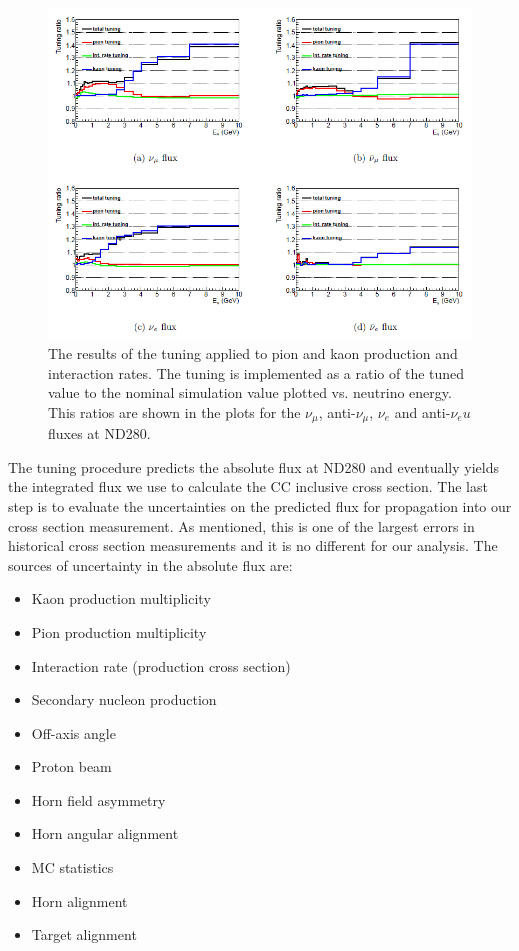 \begin{figure}
\centering
\includegraphics[width=6.5in]{Figures/flux/tuningresult.PNG}
\caption{The results of the tuning applied to pion and kaon production and interaction rates. The tuning is implemented as a ratio of the tuned value to the nominal simulation value plotted vs. neutrino energy. This ratios are shown in the plots for the  $\nu_\mu$, anti-$\nu_\mu$, $\nu_e$ and anti-$\nu_eu$ fluxes at ND280.} 
\label{fig:tuningresult}
\end{figure}

The tuning procedure predicts the absolute flux at ND280 and eventually yields the integrated flux we use to calculate the CC inclusive cross section. The last step is to evaluate the uncertainties on the predicted flux for propagation into our cross section measurement. As mentioned, this is one of the largest errors in historical cross section measurements and it is no different for our analysis. The sources of uncertainty in the absolute flux are:

\begin{itemize}
\item Kaon production multiplicity
\item Pion production multiplicity
\item Interaction rate (production cross section)
\item Secondary nucleon production
\item Off-axis angle
\item Proton beam
\item Horn field asymmetry
\item Horn angular alignment
\item MC statistics
\item Horn alignment
\item Target alignment
\end{itemize}

